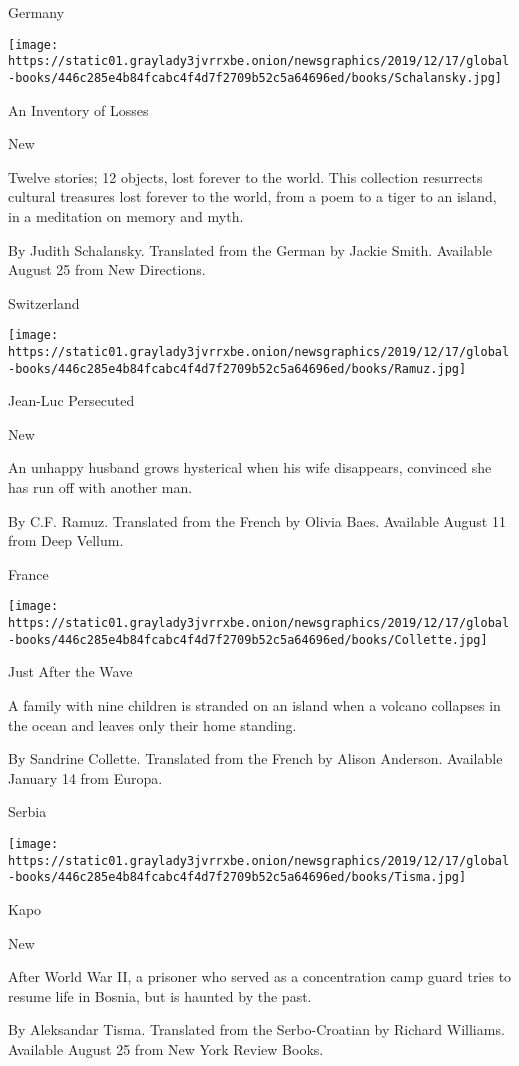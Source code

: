 Germany

\texttt{[image: https://static01.graylady3jvrrxbe.onion/newsgraphics/2019/12/17/global-books/446c285e4b84fcabc4f4d7f2709b52c5a64696ed/books/Schalansky.jpg]}

An Inventory of Losses

New

Twelve stories; 12 objects, lost forever to the world. This collection
resurrects cultural treasures lost forever to the world, from a poem to
a tiger to an island, in a meditation on memory and myth.

 By Judith Schalansky. Translated from the German by Jackie Smith.
Available August 25 from New Directions.

Switzerland

\texttt{[image: https://static01.graylady3jvrrxbe.onion/newsgraphics/2019/12/17/global-books/446c285e4b84fcabc4f4d7f2709b52c5a64696ed/books/Ramuz.jpg]}

Jean-Luc Persecuted

New

An unhappy husband grows hysterical when his wife disappears, convinced
she has run off with another man.

 By C.F. Ramuz. Translated from the French by Olivia Baes. Available
August 11 from Deep Vellum.

France

\texttt{[image: https://static01.graylady3jvrrxbe.onion/newsgraphics/2019/12/17/global-books/446c285e4b84fcabc4f4d7f2709b52c5a64696ed/books/Collette.jpg]}

Just After the Wave

A family with nine children is stranded on an island when a volcano
collapses in the ocean and leaves only their home standing.

 By Sandrine Collette. Translated from the French by Alison Anderson.
Available January 14 from Europa.

Serbia

\texttt{[image: https://static01.graylady3jvrrxbe.onion/newsgraphics/2019/12/17/global-books/446c285e4b84fcabc4f4d7f2709b52c5a64696ed/books/Tisma.jpg]}

Kapo

New

After World War II, a prisoner who served as a concentration camp guard
tries to resume life in Bosnia, but is haunted by the past.

 By Aleksandar Tisma. Translated from the Serbo-Croatian by Richard
Williams. Available August 25 from New York Review Books.

